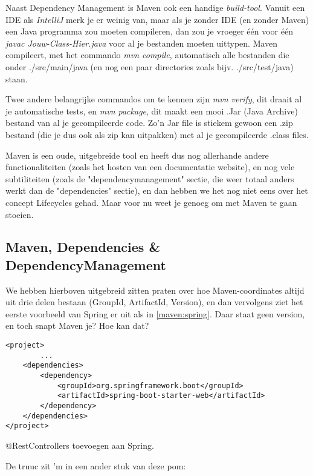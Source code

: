 Naast Dependency Management is Maven ook een handige \emph{build-tool}. Vanuit een IDE als \emph{IntelliJ} merk je er weinig
van, maar als je zonder IDE (en zonder Maven) een Java programma zou moeten compileren, dan zou je vroeger 
één voor één \textit{javac Jouw-Class-Hier.java} voor al je bestanden moeten uittypen. 
Maven compileert, met het commando \emph{mvn compile}, automatisch alle bestanden die onder ./src/main/java 
(en nog een paar directories zoals bijv. ./src/test/java) staan.

Twee andere belangrijke commandos om te kennen zijn \emph{mvn verify}, dit draait al je automatische tests, 
en \emph{mvn package}, dit maakt een mooi .Jar (Java Archive) bestand van al je gecompileerde code. Zo'n Jar file is 
stiekem gewoon een .zip bestand (die je dus ook als zip kan uitpakken) met al je gecompileerde .class files.

Maven is een oude, uitgebreide tool en heeft dus nog allerhande andere functionaliteiten (zoals het hosten van een documentatie website), 
en nog vele subtiliteiten (zoals de "dependencymanagement" sectie, die weer totaal anders werkt dan de "dependencies" sectie), en dan
hebben we het nog niet eens over het concept Lifecycles gehad. Maar voor nu weet je genoeg om met Maven te gaan stoeien.

\subsection*{Maven, Dependencies \& DependencyManagement}

We hebben hierboven uitgebreid zitten praten over hoe Maven-coordinates altijd uit drie delen bestaan (GroupId, ArtifactId, Version),
en dan vervolgens ziet het eerste voorbeeld van Spring er uit als in \ref{maven:spring}. Daar staat geen 
version, en toch snapt Maven je? Hoe kan dat?

\begin{listing}[H]
    \begin{verbatim}
<project>
        ...
    <dependencies>
        <dependency>
            <groupId>org.springframework.boot</groupId>
            <artifactId>spring-boot-starter-web</artifactId>
        </dependency>
    </dependencies>
</project>
    \end{verbatim}
    \caption{@RestControllers toevoegen aan Spring.}
    \label{maven:spring}
\end{listing}

De truuc zit 'm in een ander stuk van deze pom:

